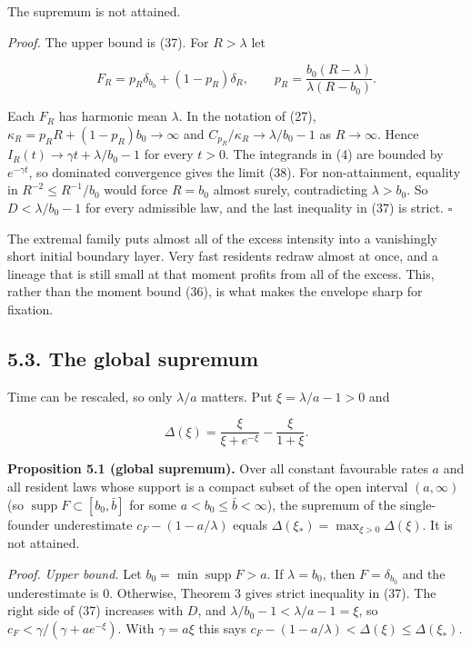 \documentclass[
  british,
  11pt,
  a4paper,
]{article}
\begin{document}
The supremum is not attained.

\emph{Proof.} The upper bound is (37). For \(R>\lambda\) let

\[
F_R=p_R\delta_{b_0}+(1-p_R)\delta_R,\qquad
p_R=\frac{b_0(R-\lambda)}{\lambda(R-b_0)}.
\tag{39}
\]

Each \(F_R\) has harmonic mean \(\lambda\). In the notation of (27),
\(\kappa_R=p_RR+(1-p_R)b_0\to\infty\) and
\(C_{p_R}/\kappa_R\to\lambda/b_0-1\) as \(R\to\infty\). Hence
\(I_R(t)\to\gamma t+\lambda/b_0-1\) for every \(t>0\). The integrands in
(4) are bounded by \(e^{-\gamma t}\), so dominated convergence gives the
limit (38). For non-attainment, equality in \(R^{-2}\le R^{-1}/b_0\)
would force \(R=b_0\) almost surely, contradicting \(\lambda>b_0\). So
\(D<\lambda/b_0-1\) for every admissible law, and the last inequality in
(37) is strict. \(\square\)

The extremal family puts almost all of the excess intensity into a
vanishingly short initial boundary layer. Very fast residents redraw
almost at once, and a lineage that is still small at that moment profits
from all of the excess. This, rather than the moment bound (36), is what
makes the envelope sharp for fixation.

\subsection{5.3. The global supremum}\label{the-global-supremum}

Time can be rescaled, so only \(\lambda/a\) matters. Put
\(\xi=\lambda/a-1>0\) and

\[
\Delta(\xi)=\frac{\xi}{\xi+e^{-\xi}}-\frac{\xi}{1+\xi}.
\tag{40}
\]

\textbf{Proposition 5.1 (global supremum).} Over all constant favourable
rates \(a\) and all resident laws whose support is a compact subset of
the open interval \((a,\infty)\) (so
\(\operatorname{supp}F\subset[b_0,\bar b]\) for some
\(a<b_0\le\bar b<\infty\)), the supremum of the single-founder
underestimate \(c_F-(1-a/\lambda)\) equals
\(\Delta(\xi_*)=\max_{\xi>0}\Delta(\xi)\). It is not attained.

\emph{Proof.} \emph{Upper bound.} Let
\(b_0=\min\operatorname{supp}F>a\). If \(\lambda=b_0\), then
\(F=\delta_{b_0}\) and the underestimate is \(0\). Otherwise, Theorem 3
gives strict inequality in (37). The right side of (37) increases with
\(D\), and \(\lambda/b_0-1<\lambda/a-1=\xi\), so
\(c_F<\gamma/(\gamma+ae^{-\xi})\). With \(\gamma=a\xi\) this says
\(c_F-(1-a/\lambda)<\Delta(\xi)\le\Delta(\xi_*)\).
\end{document}
